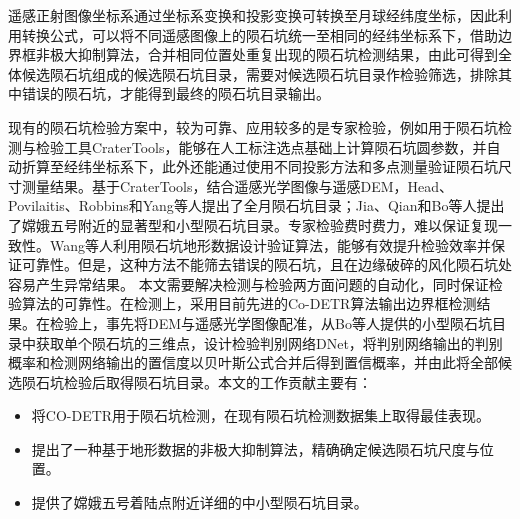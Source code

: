 遥感正射图像坐标系通过坐标系变换和投影变换可转换至月球经纬度坐标，因此利用转换公式，可以将不同遥感图像上的陨石坑统一至相同的经纬坐标系下，借助边界框非极大抑制算法，合并相同位置处重复出现的陨石坑检测结果，由此可得到全体候选陨石坑组成的候选陨石坑目录，需要对候选陨石坑目录作检验筛选，排除其中错误的陨石坑，才能得到最终的陨石坑目录输出。

现有的陨石坑检验方案中，较为可靠、应用较多的是专家检验，例如用于陨石坑检测与检验工具CraterTools\cite{kneisslMapprojectionindependentCraterSizefrequency2011}，能够在人工标注选点基础上计算陨石坑圆参数，并自动折算至经纬坐标系下，此外还能通过使用不同投影方法和多点测量验证陨石坑尺寸测量结果。基于CraterTools，结合遥感光学图像与遥感DEM，Head\cite{headGlobalDistributionLarge2010}、Povilaitis\cite{povilaitisCraterDensityDifferences2018}、Robbins\cite{robbinsNewGlobalDatabase2019}和Yang\cite{yangLunarImpactCrater2020}等人提出了全月陨石坑目录；Jia\cite{jiaCatalogueImpactCraters2020}、Qian\cite{qianCopernicanaged200Ma2021}和Bo\cite{boCatalogueMeterscaleImpact2022}等人提出了嫦娥五号附近的显著型和小型陨石坑目录。专家检验费时费力，难以保证复现一致性。Wang\cite{wangImprovedGlobalCatalog2021}等人利用陨石坑地形数据设计验证算法，能够有效提升检验效率并保证可靠性。但是，这种方法不能筛去错误的陨石坑，且在边缘破碎的风化陨石坑处容易产生异常结果。
本文需要解决检测与检验两方面问题的自动化，同时保证检验算法的可靠性。在检测上，采用目前先进的Co-DETR算法输出边界框检测结果。在检验上，事先将DEM与遥感光学图像配准，从Bo\cite{boCatalogueMeterscaleImpact2022}等人提供的小型陨石坑目录中获取单个陨石坑的三维点，设计检验判别网络DNet，将判别网络输出的判别概率和检测网络输出的置信度以贝叶斯公式合并后得到置信概率，并由此将全部候选陨石坑检验后取得陨石坑目录。本文的工作贡献主要有：
\begin{itemize}
  \item 将CO-DETR用于陨石坑检测，在现有陨石坑检测数据集上取得最佳表现。
  \item 提出了一种基于地形数据的非极大抑制算法，精确确定候选陨石坑尺度与位置。
  \item 提供了嫦娥五号着陆点附近详细的中小型陨石坑目录。
\end{itemize}